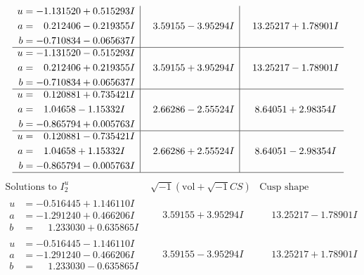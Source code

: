 \documentclass[1p]{elsarticle_modified}
\theoremstyle{definition}
\newcommand{\I}{\sqrt{-1}}
\begin{document}
$$\begin{array}{c|c|c}
\begin{aligned}
u &= -1.131520 + 0.515293 I \\
a &= \phantom{-}0.212406 - 0.219355 I \\
b &= -0.710834 - 0.065637 I\end{aligned}
 & \phantom{-}3.59155 - 3.95294 I & \phantom{-}13.25217 + 1.78901 I \\ \hline\begin{aligned}
u &= -1.131520 - 0.515293 I \\
a &= \phantom{-}0.212406 + 0.219355 I \\
b &= -0.710834 + 0.065637 I\end{aligned}
 & \phantom{-}3.59155 + 3.95294 I & \phantom{-}13.25217 - 1.78901 I \\ \hline\begin{aligned}
u &= \phantom{-}0.120881 + 0.735421 I \\
a &= \phantom{-}1.04658 - 1.15332 I \\
b &= -0.865794 + 0.005763 I\end{aligned}
 & \phantom{-}2.66286 - 2.55524 I & \phantom{-}8.64051 + 2.98354 I \\ \hline\begin{aligned}
u &= \phantom{-}0.120881 - 0.735421 I \\
a &= \phantom{-}1.04658 + 1.15332 I \\
b &= -0.865794 - 0.005763 I\end{aligned}
 & \phantom{-}2.66286 + 2.55524 I & \phantom{-}8.64051 - 2.98354 I\\
 \hline 
 \end{array}$$\newpage$$\begin{array}{c|c|c}  
\text{Solutions to }I^u_{2}& \I (\text{vol} + \sqrt{-1}CS) & \text{Cusp shape}\\
 \hline 
\begin{aligned}
u &= -0.516445 + 1.146110 I \\
a &= -1.291240 + 0.466206 I \\
b &= \phantom{-}1.233030 + 0.635865 I\end{aligned}
 & \phantom{-}3.59155 + 3.95294 I & \phantom{-}13.25217 - 1.78901 I \\ \hline\begin{aligned}
u &= -0.516445 - 1.146110 I \\
a &= -1.291240 - 0.466206 I \\
b &= \phantom{-}1.233030 - 0.635865 I\end{aligned}
 & \phantom{-}3.59155 - 3.95294 I & \phantom{-}13.25217 + 1.78901 I \\ \hline\begin{aligned}

\end{aligned}
\end{array}$$
\end{document}

